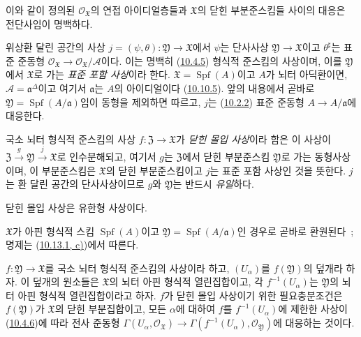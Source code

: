 이와 같이 정의된 $\mathscr{O}_{\mathfrak{X}}$의 연접 아이디얼층들과
$\mathfrak{X}$의 닫힌 부분준스킴들 사이의 대응은 전단사임이 명백하다.

위상환 달린 공간의 사상
$j=(\psi,\theta):\mathfrak{Y}\to\mathfrak{X}$에서 $\psi$는 단사사상
$\mathfrak{Y}\to\mathfrak{X}$이고 $\theta^\sharp$는 표준 준동형
$\mathscr{O}_{\mathfrak{X}}\to\mathscr{O}_{\mathfrak{X}}/\mathscr{A}$이다.
이는 명백히 (\hyperref[I.10.4.5-ko]{10.4.5}) 형식적 준스킴의
사상이며, 이를 $\mathfrak{Y}$에서 $\mathfrak{X}$로 가는
\emph{표준 포함 사상}이라 한다. $\mathfrak{X}=\operatorname{Spf}(A)$이고
$A$가 뇌터 아딕환이면, $\mathscr{A}=\mathfrak{a}^\Delta$이고 여기서
$\mathfrak{a}$는 $A$의 아이디얼이다
(\hyperref[I.10.10.5-ko]{10.10.5}). 앞의 내용에서 곧바로
$\mathfrak{Y}=\operatorname{Spf}(A/\mathfrak{a})$임이 동형을 제외하면
따르고, $j$는 (\hyperref[I.10.2.2-ko]{10.2.2}) 표준 준동형
$A\to A/\mathfrak{a}$에 대응한다.

국소 뇌터 형식적 준스킴의 사상
$f:\mathfrak{Z}\to\mathfrak{X}$가 \emph{닫힌 몰입 사상}이라 함은
이 사상이 $\mathfrak{Z}\xrightarrow{g}\mathfrak{Y}\xrightarrow{j}\mathfrak{X}$로
인수분해되고, 여기서 $g$는 $\mathfrak{Z}$에서 닫힌 부분준스킴
$\mathfrak{Y}$로 가는 동형사상이며, 이 부분준스킴은 $\mathfrak{X}$의
닫힌 부분준스킴이고 $j$는 표준 포함
사상인 것을 뜻한다. $j$는 환 달린 공간의 단사사상이므로 $g$와
$\mathfrak{Y}$는 반드시 \emph{유일}하다.

\begin{proposition}[10.14.3]
\label{I.10.14.3-ko}
닫힌 몰입 사상은 유한형 사상이다.
\end{proposition}

$\mathfrak{X}$가 아핀 형식적 스킴 $\operatorname{Spf}(A)$이고
$\mathfrak{Y}=\operatorname{Spf}(A/\mathfrak{a})$인 경우로 곧바로
환원된다~; 명제는 (\hyperref[I.10.13.1-ko]{10.13.1, c)})에서 따른다.

\begin{lemma}[10.14.4]
\label{I.10.14.4-ko}
$f:\mathfrak{Y}\to\mathfrak{X}$를 국소 뇌터 형식적 준스킴의
사상이라 하고, $(U_\alpha)$를 $f(\mathfrak{Y})$의 덮개라 하자. 이
덮개의 원소들은 $\mathfrak{X}$의 뇌터 아핀 형식적 열린집합이고, 각
$f^{-1}(U_\alpha)$는
$\mathfrak{Y}$의 뇌터 아핀 형식적 열린집합이라고 하자. $f$가 닫힌
몰입 사상이기 위한 필요충분조건은 $f(\mathfrak{Y})$가
$\mathfrak{X}$의 닫힌 부분집합이고, 모든 $\alpha$에 대하여 $f$를
$f^{-1}(U_\alpha)$에 제한한 사상이
(\hyperref[I.10.4.6-ko]{10.4.6})에 따라 전사 준동형
$\Gamma(U_\alpha,\mathscr{O}_{\mathfrak{X}})\to
\Gamma(f^{-1}(U_\alpha),\mathscr{O}_{\mathfrak{Y}})$에 대응하는 것이다.
\end{lemma}

